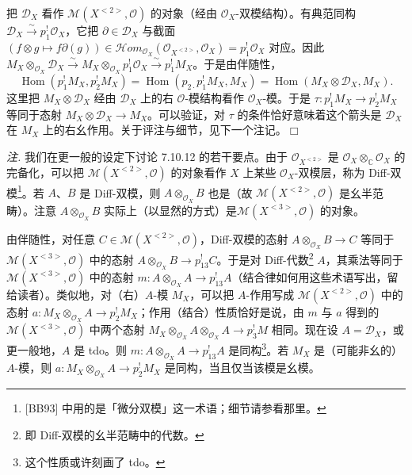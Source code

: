 把 $\mathcal{D}_{X}$ 看作 $\mathcal{M}(X^{<2>},\mathcal{O})$ 的对象（经由 $\mathcal{O}_{X}$-双模结构）。有典范同构 $\mathcal{D}_{X}\xrightarrow{\sim}p^{!}_{1}\mathcal{O}_{X}$，它把 $\partial\in\mathcal{D}_{X}$ 与截面 $(f\otimes g\mapsto f\partial(g))\in\mathcal{H}om_{\mathcal{O}_{X}}(\mathcal{O}_{X^{<2>}},\mathcal{O}_{X})=p^{!}_{1}\mathcal{O}_{X}$ 对应。因此 $M_{X}\otimes_{\mathcal{O}_{X}}\mathcal{D}_{X}\xrightarrow{\sim}M_{X}\otimes_{\mathcal{O}_{X}}p^{!}_{1}\mathcal{O}_{X}\xrightarrow{\sim}p^{!}_{1}M_{X}$。于是由伴随性，
\begin{equation}\tag{341}
\operatorname{Hom}(p^{!}_{1}M_{X},p^{!}_{2}M_{X})=\operatorname{Hom}(p_{2\cdot}p^{!}_{1}M_{X},M_{X})=\operatorname{Hom}(M_{X}\otimes\mathcal{D}_{X},M_{X}).
\end{equation}
这里把 $M_{X}\otimes\mathcal{D}_{X}$ 经由 $\mathcal{D}_{X}$ 上的右 $\mathcal{O}$-模结构看作 $\mathcal{O}_{X}$-模。于是 $\tau:p^{!}_{1}M_{X}\to p^{!}_{2}M_{X}$ 等同于态射 $M_{X}\otimes\mathcal{D}_{X}\to M_{X}$。可以验证，对 $\tau$ 的条件恰好意味着这个箭头是 $\mathcal{D}_{X}$ 在 $M_{X}$ 上的右幺作用。关于评注与细节，见下一个注记。\hfill$\Box$

 \emph{注.} 我们在更一般的设定下讨论 7.10.12 的若干要点。由于 $\mathcal{O}_{X^{<2>}}$ 是 $\mathcal{O}_{X}\otimes_{\mathbb{C}}\mathcal{O}_{X}$ 的完备化，可以把 $\mathcal{M}(X^{<2>},\mathcal{O})$ 的对象看作 $X$ 上某些 $\mathcal{O}_{X}$-双模层，称为 Diff-双模\footnote{[BB93] 中用的是「微分双模」这一术语；细节请参看那里。}。若 $A$、$B$ 是 Diff-双模，则 $A\otimes_{\mathcal{O}_{X}}B$ 也是（故 $\mathcal{M}(X^{<2>},\mathcal{O})$ 是幺半范畴）。注意 $A\otimes_{\mathcal{O}_{X}}B$ 实际上（以显然的方式）是$\mathcal{M}(X^{<3>},\mathcal{O})$ 的对象。

由伴随性，对任意 $C\in\mathcal{M}(X^{<2>},\mathcal{O})$，Diff-双模的态射 $A\otimes_{\mathcal{O}_{X}}B\to C$ 等同于 $\mathcal{M}(X^{<3>},\mathcal{O})$ 中的态射 $A\otimes_{\mathcal{O}_{X}}B\to p^{!}_{13}C$。于是对 Diff-代数\footnote{即 Diff-双模的幺半范畴中的代数。} $A$，其乘法等同于 $\mathcal{M}(X^{<3>},\mathcal{O})$ 中的态射 $m:A\otimes_{\mathcal{O}_{X}}A\to p^{!}_{13}A$（结合律如何用这些术语写出，留给读者）。类似地，对（右）$A$-模 $M_{X}$，可以把 $A$-作用写成 $\mathcal{M}(X^{<2>},\mathcal{O})$ 中的态射 $a:M_{X}\otimes_{\mathcal{O}_{X}}A\to p^{!}_{2}M_{X}$；作用（结合）性质恰好是说，由 $m$ 与 $a$ 得到的 $\mathcal{M}(X^{<3>},\mathcal{O})$ 中两个态射 $M_{X}\otimes_{\mathcal{O}_{X}}A\otimes_{\mathcal{O}_{X}}A\to p^{!}_{3}M$ 相同。现在设 $A=\mathcal{D}_{X}$，或更一般地，$A$ 是 tdo。则 $m:A\otimes_{\mathcal{O}_{X}}A\to p^{!}_{13}A$ 是同构\footnote{这个性质或许刻画了 tdo。}。若 $M_{X}$ 是（可能非幺的）$A$-模，则 $a:M_{X}\otimes_{\mathcal{O}_{X}}A\to p^{!}_{2}M_{X}$ 是同构，当且仅当该模是幺模。

